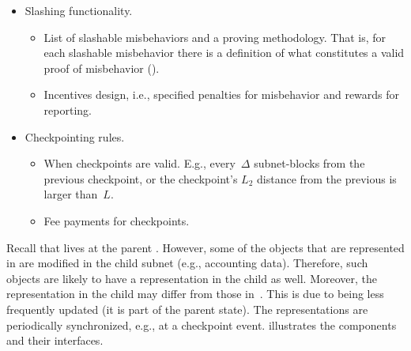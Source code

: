 %
\begin{itemize}
    \item Slashing functionality.
    \begin{itemize}
        \item List of slashable misbehaviors and a proving methodology. That is, for each slashable misbehavior there is a definition of what constitutes a valid proof of misbehavior (\pom).
        \item Incentives design, i.e., specified penalties for misbehavior and rewards for reporting.
    \end{itemize}
    \item Checkpointing rules.
    \begin{itemize}
        \item When checkpoints are valid. E.g., every~$\Delta$ subnet-blocks from the previous checkpoint, or the checkpoint's $L_2$ distance from the previous is larger than~$L$.
        \item Fee payments for checkpoints.
    \end{itemize}
\end{itemize}
Recall that \sa lives at the parent \smr. However, some of the objects that are represented in \sa are modified in the child subnet (e.g., accounting data). Therefore, such objects are likely to have a representation in the child \smr as well.
Moreover, the representation in the child \smr may differ from those in~\sa. This is due to \sa being less frequently updated (it is part of the parent \smr state). The representations are periodically synchronized, e.g., at a checkpoint event.  illustrates the components and their interfaces.\\


